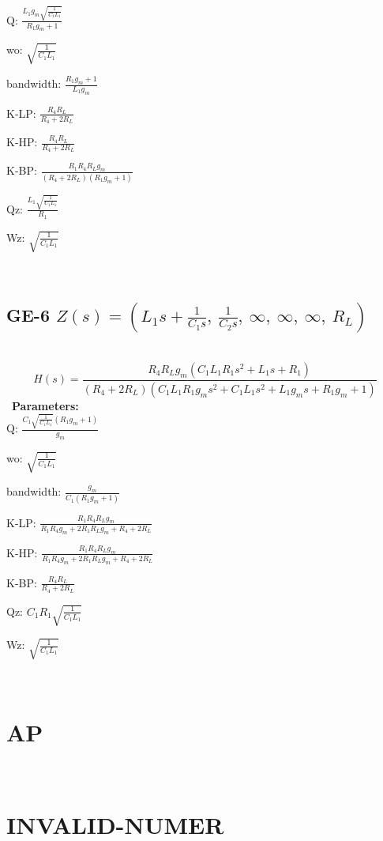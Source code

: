 \documentclass{article}
\begin{document}
Q: $\frac{L_{1} g_{m} \sqrt{\frac{1}{C_{1} L_{1}}}}{R_{1} g_{m} + 1}$\ 

wo: $\sqrt{\frac{1}{C_{1} L_{1}}}$\ 

bandwidth: $\frac{R_{1} g_{m} + 1}{L_{1} g_{m}}$\ 

K-LP: $\frac{R_{4} R_{L}}{R_{4} + 2 R_{L}}$\ 

K-HP: $\frac{R_{4} R_{L}}{R_{4} + 2 R_{L}}$\ 

K-BP: $\frac{R_{1} R_{4} R_{L} g_{m}}{\left(R_{4} + 2 R_{L}\right) \left(R_{1} g_{m} + 1\right)}$\ 

Qz: $\frac{L_{1} \sqrt{\frac{1}{C_{1} L_{1}}}}{R_{1}}$\ 

Wz: $\sqrt{\frac{1}{C_{1} L_{1}}}$\ 

\ 

\subsection{GE-6 $Z(s) = \left( L_{1} s + \frac{1}{C_{1} s}, \  \frac{1}{C_{2} s}, \  \infty, \  \infty, \  \infty, \  R_{L}\right)$ } \ 
\textbf{\[H(s) = \frac{R_{4} R_{L} g_{m} \left(C_{1} L_{1} R_{1} s^{2} + L_{1} s + R_{1}\right)}{\left(R_{4} + 2 R_{L}\right) \left(C_{1} L_{1} R_{1} g_{m} s^{2} + C_{1} L_{1} s^{2} + L_{1} g_{m} s + R_{1} g_{m} + 1\right)}\] } \ 
\textbf{Parameters:}\\ 

Q: $\frac{C_{1} \sqrt{\frac{1}{C_{1} L_{1}}} \left(R_{1} g_{m} + 1\right)}{g_{m}}$\ 

wo: $\sqrt{\frac{1}{C_{1} L_{1}}}$\ 

bandwidth: $\frac{g_{m}}{C_{1} \left(R_{1} g_{m} + 1\right)}$\ 

K-LP: $\frac{R_{1} R_{4} R_{L} g_{m}}{R_{1} R_{4} g_{m} + 2 R_{1} R_{L} g_{m} + R_{4} + 2 R_{L}}$\ 

K-HP: $\frac{R_{1} R_{4} R_{L} g_{m}}{R_{1} R_{4} g_{m} + 2 R_{1} R_{L} g_{m} + R_{4} + 2 R_{L}}$\ 

K-BP: $\frac{R_{4} R_{L}}{R_{4} + 2 R_{L}}$\ 

Qz: $C_{1} R_{1} \sqrt{\frac{1}{C_{1} L_{1}}}$\ 

Wz: $\sqrt{\frac{1}{C_{1} L_{1}}}$\ 

\ 

\section{AP}\ 
\section{INVALID-NUMER}\ 
\end{document}
